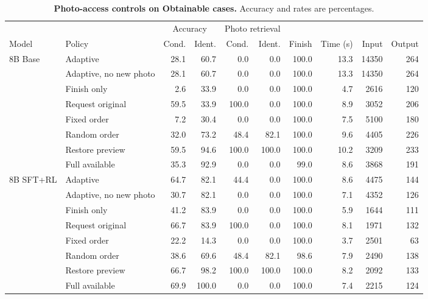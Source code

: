 \begin{table}[t]\centering\small\setlength{\tabcolsep}{4pt}
\caption{\textbf{Photo-access controls on Obtainable cases.}
Accuracy and rates are percentages.}
\label{tab:evidence-interventions}
\begin{tabular}{@{}llrrrrrrrr@{}}\toprule
& & \multicolumn{2}{c}{Accuracy} & \multicolumn{2}{c}{Photo retrieval} & & & &\\
Model & Policy & Cond. & Ident. & Cond. & Ident. & Finish & Time (s) & Input & Output\\\midrule
8B Base & Adaptive & 28.1 & 60.7 & 0.0 & 0.0 & 100.0 & 13.3 & 14350 & 264\\
 & Adaptive, no new photo & 28.1 & 60.7 & 0.0 & 0.0 & 100.0 & 13.3 & 14350 & 264\\
 & Finish only & 2.6 & 33.9 & 0.0 & 0.0 & 100.0 & 4.7 & 2616 & 120\\
 & Request original & 59.5 & 33.9 & 100.0 & 0.0 & 100.0 & 8.9 & 3052 & 206\\
 & Fixed order & 7.2 & 30.4 & 0.0 & 0.0 & 100.0 & 7.5 & 5100 & 180\\
 & Random order & 32.0 & 73.2 & 48.4 & 82.1 & 100.0 & 9.6 & 4405 & 226\\
 & Restore preview & 59.5 & 94.6 & 100.0 & 100.0 & 100.0 & 10.2 & 3209 & 233\\
 & Full available & 35.3 & 92.9 & 0.0 & 0.0 & 99.0 & 8.6 & 3868 & 191\\
\midrule
8B SFT+RL & Adaptive & 64.7 & 82.1 & 44.4 & 0.0 & 100.0 & 8.6 & 4475 & 144\\
 & Adaptive, no new photo & 30.7 & 82.1 & 0.0 & 0.0 & 100.0 & 7.1 & 4352 & 126\\
 & Finish only & 41.2 & 83.9 & 0.0 & 0.0 & 100.0 & 5.9 & 1644 & 111\\
 & Request original & 66.7 & 83.9 & 100.0 & 0.0 & 100.0 & 8.1 & 1971 & 132\\
 & Fixed order & 22.2 & 14.3 & 0.0 & 0.0 & 100.0 & 3.7 & 2501 & 63\\
 & Random order & 38.6 & 69.6 & 48.4 & 82.1 & 98.6 & 7.9 & 2490 & 138\\
 & Restore preview & 66.7 & 98.2 & 100.0 & 100.0 & 100.0 & 8.2 & 2092 & 133\\
 & Full available & 69.9 & 100.0 & 0.0 & 0.0 & 100.0 & 7.4 & 2215 & 124\\
\bottomrule
\end{tabular}\end{table}
